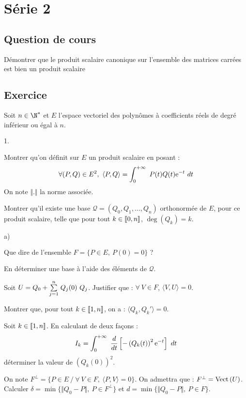 \documentclass[11pt]{article}%
\begin{document}
\section*{Série 2}
\subsection*{Question de cours}
\noindent
Démontrer que le produit scalaire canonique sur l'ensemble des matrices 
carrées est bien un produit scalaire

\subsection*{Exercice} %
\noindent
Soit $n\in\N^*$ et $E$ l'espace vectoriel des polynômes à coefficients 
réels de degré inférieur ou égal à $n$.
\begin{noliste}{1.}
 \item Montrer qu'on définit sur $E$ un produit scalaire en posant :
 \[
  \forall (P,Q)\in E^2, \ \langle P,Q \rangle = \displaystyle \int_{0}^{+\infty}\  
  P(t)Q(t) \text{e}^{-t} \ dt
 \]
 On note $\Vert . \Vert$ la norme associée.
 
 \item Montrer qu'il existe une base $\mathcal{Q}=(Q_0,Q_1, \hdots, 
  Q_n)$ orthonormée de $E$, pour ce produit scalaire, telle que pour 
  tout $k\in\llbracket 0,n\rrbracket$, $\deg(Q_k)=k$.
  
  \item 
  \begin{noliste}{a)}
    \item Que dire de l'ensemble $F=\{P\in E, \ P(0)=0\}$ ?
    
    \item En déterminer une base à l'aide des éléments de $\mathcal{Q}$.
  \end{noliste}
  
  \item Soit $U=Q_0 + \Sum{j=1}{n} Q_j(0) \ Q_j$.
  Justifier que : $\forall \ V \in F$, $\langle V,U\rangle =0$.
  
  \item Montrer que, pour tout $k\in\llbracket 1,n\rrbracket$, on a :
  $\langle Q_k, Q_k'\rangle =0$.
  
  \item Soit $k\in\llbracket 1,n\rrbracket$. En calculant de deux façons :
  \[
   I_k=\displaystyle \int_{0}^{+\infty}\  \dfrac{d}{dt}\left[-\left(Q_k(t)\right)^2 
   \text{e}^{-t}\right] \ dt
  \]
  déterminer la valeur de $\left(Q_k(0)\right)^2$.
  
  \item On note $F^\perp = \{ P \in E \ / \ \forall \ V \in F, \ 
  \langle P, V\rangle =0\}$.
  On admettra que : $F^\perp = {\rm{Vect}}\left(U\right)$.\\
  Calculer $\delta = \min\{\Vert Q_0-P\Vert, \ P \in F^\perp\}$ 
  et $d=\min\{\Vert Q_0-P\Vert, \ P\in F\}$.
\end{noliste}
\end{document}

